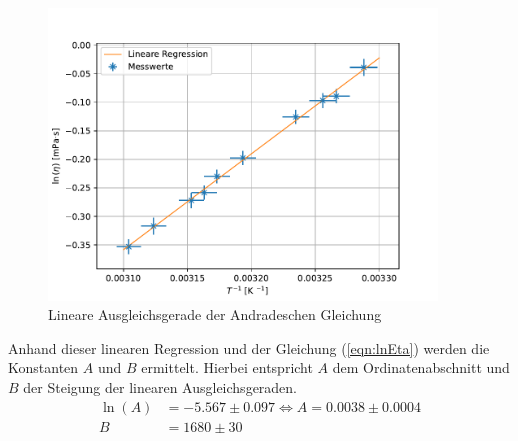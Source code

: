 \begin{figure}[H]
  \centering
  \includegraphics[width=0.92\textwidth]{plot.pdf}
  \caption{Lineare Ausgleichsgerade der Andradeschen Gleichung}
  \label{fig:plot}
\end{figure}
Anhand dieser linearen Regression und der Gleichung (\ref{eqn:lnEta}) werden die Konstanten $A$ und $B$ 
ermittelt. Hierbei entspricht $A$ dem Ordinatenabschnitt und $B$ der Steigung der 
linearen Ausgleichsgeraden.
\begin{align*}
  \ln\left(A\right) &= -5.567 \pm 0.097 \Longleftrightarrow A = 0.0038\pm0.0004\\
  B &= 1680\pm30
\end{align*}
